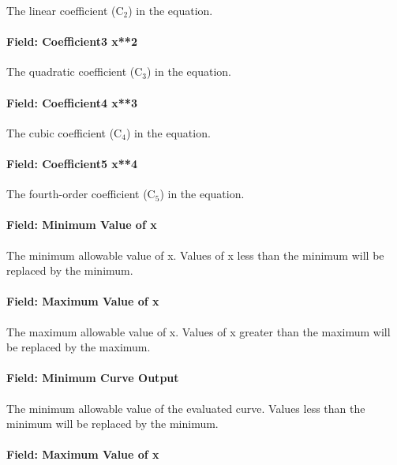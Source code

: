 The linear coefficient (C\(_{2}\)) in the equation.

\paragraph{Field: Coefficient3 x**2}\label{field-coefficient3-x2-2}

The quadratic coefficient (C\(_{3}\)) in the equation.

\paragraph{Field: Coefficient4 x**3}\label{field-coefficient4-x3-1}

The cubic coefficient (C\(_{4}\)) in the equation.

\paragraph{Field: Coefficient5 x**4}\label{field-coefficient5-x4}

The fourth-order coefficient (C\(_{5}\)) in the equation.

\paragraph{Field: Minimum Value of x}\label{field-minimum-value-of-x-4}

The minimum allowable value of x. Values of x less than the minimum will be replaced by the minimum.

\paragraph{Field: Maximum Value of x}\label{field-maximum-value-of-x-4}

The maximum allowable value of x. Values of x greater than the maximum will be replaced by the maximum.

\paragraph{Field: Minimum Curve Output}\label{field-minimum-curve-output-3}

The minimum allowable value of the evaluated curve. Values less than the minimum will be replaced by the minimum.

\paragraph{Field: Maximum Value of x}\label{field-maximum-value-of-x-5}

